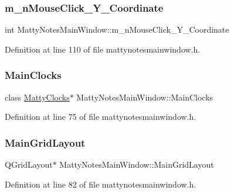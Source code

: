 \subsubsection{\texorpdfstring{m\+\_\+n\+Mouse\+Click\+\_\+\+Y\+\_\+\+Coordinate}{m\_nMouseClick\_Y\_Coordinate}}
{\footnotesize\ttfamily int Matty\+Notes\+Main\+Window\+::m\+\_\+n\+Mouse\+Click\+\_\+\+Y\+\_\+\+Coordinate\hspace{0.3cm}{\ttfamily [private]}}



Definition at line 110 of file mattynotesmainwindow.\+h.

\hypertarget{classMattyNotesMainWindow_afe11d413e344c6d00bdceef2d500e47d}{}\label{classMattyNotesMainWindow_afe11d413e344c6d00bdceef2d500e47d} 
\subsubsection{\texorpdfstring{Main\+Clocks}{MainClocks}}
{\footnotesize\ttfamily class \hyperlink{classMattyClocks}{Matty\+Clocks}$\ast$ Matty\+Notes\+Main\+Window\+::\+Main\+Clocks\hspace{0.3cm}{\ttfamily [private]}}



Definition at line 75 of file mattynotesmainwindow.\+h.

\hypertarget{classMattyNotesMainWindow_a8d6b99e6a4b055ac1e27bcced0dbdbcf}{}\label{classMattyNotesMainWindow_a8d6b99e6a4b055ac1e27bcced0dbdbcf} 
\subsubsection{\texorpdfstring{Main\+Grid\+Layout}{MainGridLayout}}
{\footnotesize\ttfamily Q\+Grid\+Layout$\ast$ Matty\+Notes\+Main\+Window\+::\+Main\+Grid\+Layout\hspace{0.3cm}{\ttfamily [private]}}



Definition at line 82 of file mattynotesmainwindow.\+h.

\hypertarget{classMattyNotesMainWindow_a23bccec30dacb989e0e86c20e3afd037}{}\label{classMattyNotesMainWindow_a23bccec30dacb989e0e86c20e3afd037} 
